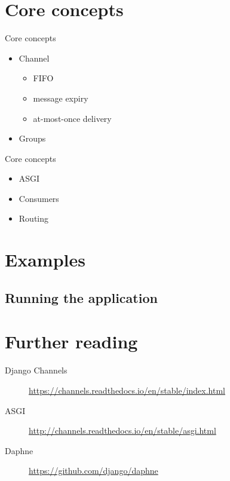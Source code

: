 \documentclass{beamer}
\begin{document}
\section{Core concepts}

\begin{frame}{Core concepts}
	\begin{adjustwidth}{2em}{2.5em}
	\begin{itemize}
		\item Channel
			\begin{itemize}
				\item FIFO
				\item message expiry
				\item at-most-once delivery
			\end{itemize}
		\item Groups
	\end{itemize}
	\end{adjustwidth}
\end{frame}

\begin{frame}{Core concepts}
	\begin{adjustwidth}{2em}{2.5em}
	\begin{itemize}
		\item ASGI
		\item Consumers
		\item Routing
	\end{itemize}
	\end{adjustwidth}
\end{frame}

\section{Examples}

\subsection{Running the application}

\section{Further reading}

\begin{frame}
	\begin{description}
		\item[Django Channels] \url{https://channels.readthedocs.io/en/stable/index.html}
		\item[ASGI] \url{http://channels.readthedocs.io/en/stable/asgi.html}
		\item[Daphne] \url{https://github.com/django/daphne}
	\end{description}
\end{frame}
\end{document}

